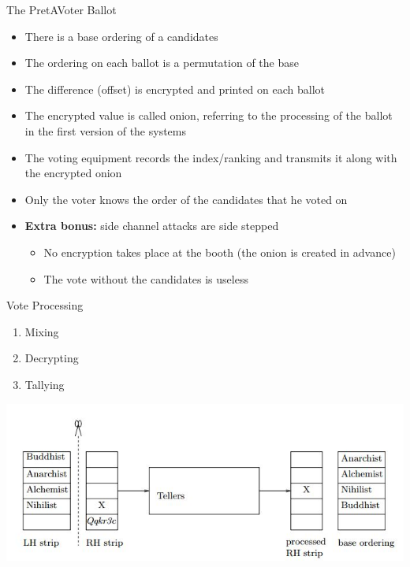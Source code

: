 \documentclass{beamer}
\begin{document}
\begin{frame}[allowframebreaks]{The PretAVoter Ballot}
\begin{itemize}
\item There is a base ordering of a candidates
\item The ordering on each ballot is a permutation of the base 
\item The difference (offset) is encrypted and printed on each ballot
\item The encrypted value is called onion, referring to the processing of the ballot in the first version of the systems
\item The voting equipment records the index/ranking and transmits it along with the encrypted onion
\item Only the voter knows the order of the candidates that he voted on
\item \textbf{Extra bonus:} side channel attacks are side stepped
\begin{itemize}
\item No encryption takes place at the booth (the onion is created in advance)
\item The vote without the candidates is useless
\end{itemize}
\end{itemize}
\end{frame}

\begin{frame}[allowframebreaks]{Vote Processing}

\begin{enumerate}
\item Mixing
\item Decrypting
\item Tallying
\end{enumerate}

\begin{center}
\includegraphics[scale=0.5]{voteprocessing}
\end{center}

\end{frame}
\end{document}
